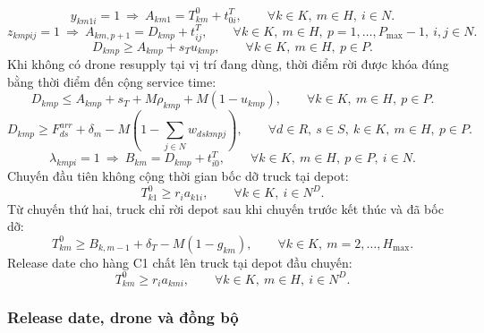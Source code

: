 \documentclass[12pt,a4paper]{article}
\begin{document}
\begin{equation}
  y_{km1i}=1\ \Longrightarrow\ A_{km1}=T^0_{km}+t^T_{0i}, \qquad \forall k\in K,\ m\in H,\ i\in N.
\end{equation}
\begin{equation}
  z_{kmpij}=1\ \Longrightarrow\ A_{km,p+1}=D_{kmp}+t^T_{ij}, \qquad \forall k\in K,\ m\in H,\ p=1,\ldots,P_{\max}-1,\ i,j\in N.
\end{equation}
\begin{equation}
  D_{kmp}\ge A_{kmp}+s_Tu_{kmp}, \qquad \forall k\in K,\ m\in H,\ p\in P.
\end{equation}
Khi không có drone resupply tại vị trí đang dùng, thời điểm rời được khóa đúng bằng
thời điểm đến cộng service time:
\begin{equation}
  D_{kmp}\le A_{kmp}+s_T+M\rho_{kmp}+M(1-u_{kmp}), \qquad \forall k\in K,\ m\in H,\ p\in P.
\end{equation}
\begin{equation}
  D_{kmp}\ge F^{arr}_{ds}+\delta_m -M\left(1-\sum_{j\in N}w_{dskmpj}\right), \qquad \forall d\in R,\ s\in S,\ k\in K,\ m\in H,\ p\in P.
\end{equation}
\begin{equation}
  \lambda_{kmpi}=1\ \Longrightarrow\ B_{km}=D_{kmp}+t^T_{i0}, \qquad \forall k\in K,\ m\in H,\ p\in P,\ i\in N.
\end{equation}
Chuyến đầu tiên không cộng thời gian bốc dỡ truck tại depot:
\begin{equation}
  T^0_{k1}\ge r_i a_{k1i}, \qquad \forall k\in K,\ i\in N^D.
\end{equation}
Từ chuyến thứ hai, truck chỉ rời depot sau khi chuyến trước kết thúc và đã bốc dỡ:
\begin{equation}
  T^0_{km}\ge B_{k,m-1}+\delta_T-M(1-g_{km}), \qquad \forall k\in K,\ m=2,\ldots,H_{\max}.
\end{equation}
Release date cho hàng C1 chất lên truck tại depot đầu chuyến:
\begin{equation}
  T^0_{km}\ge r_i a_{kmi}, \qquad \forall k\in K,\ m\in H,\ i\in N^D.
\end{equation}

\subsubsection{Release date, drone và đồng bộ}
\end{document}
